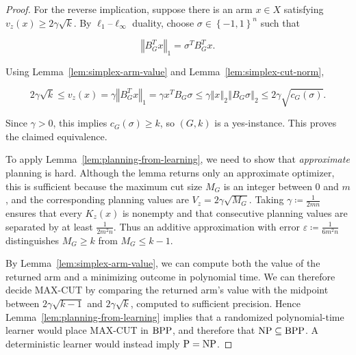 {\begin{proof}
For the reverse implication, suppose there is an arm $x \in X$ satisfying
$v_{z} \left( x \right) \ge 2 \gamma \sqrt{k}$. By $\ell_{1}$--$\ell_{\infty}$ duality, choose
$\sigma \in {\left\{ - 1 , 1 \right\}}^{n}$ such that


\begin{equation*}
{\left\Vert B_{G}^{T} x \right\Vert}_{1} = \sigma^{T} B_{G}^{T} x .
\end{equation*}


Using Lemma~\ref{lem:simplex-arm-value} and Lemma~\ref{lem:simplex-cut-norm},


\begin{equation*}
2 \gamma \sqrt{k} \le v_{z} \left( x \right) = \gamma {\left\Vert B_{G}^{T} x \right\Vert}_{1} = \gamma x^{T} B_{G} \sigma \le \gamma {\left\Vert x \right\Vert}_{2} {\left\Vert B_{G} \sigma \right\Vert}_{2} \le 2 \gamma \sqrt{c_{G} \left( \sigma \right)} .
\end{equation*}


Since $\gamma > 0$, this implies $c_{G} \left( \sigma \right) \ge k$, so $\left( G , k \right)$ is a yes-instance.
This proves the claimed equivalence.

To apply Lemma~\ref{lem:planning-from-learning}, we need to show that \emph{approximate}
planning is hard. Although the lemma returns only an approximate optimizer,
this is sufficient because the maximum cut size $M_{G}$ is an integer between
$0$ and $m$, and the corresponding planning values are
$V_{z} = 2 \gamma \sqrt{M_{G}}$. Taking $\gamma \coloneqq \frac{1}{2 m n}$ ensures that every
$K_{z} \left( x \right)$ is nonempty and that consecutive planning values are separated by
at least $\frac{1}{2 m^{2} n}$. Thus an additive approximation with error
$\varepsilon \coloneqq \frac{1}{6 m^{2} n}$ distinguishes $M_{G} \ge k$ from $M_{G} \le k - 1$.

By Lemma~\ref{lem:simplex-arm-value}, we can compute both the value of the returned arm
and a minimizing outcome in polynomial time. We can therefore decide MAX-CUT
by comparing the returned arm's value with the midpoint between
$2 \gamma \sqrt{k - 1}$ and $2 \gamma \sqrt{k}$, computed to sufficient precision.
Hence Lemma~\ref{lem:planning-from-learning} implies that a randomized polynomial-time
learner would place MAX-CUT in $\text{\normalfont BPP}$, and therefore that
$\text{\normalfont NP} \subseteq \text{\normalfont BPP}$. A deterministic learner would instead imply
$\text{\normalfont P} = \text{\normalfont NP}$.
\end{proof}




}
